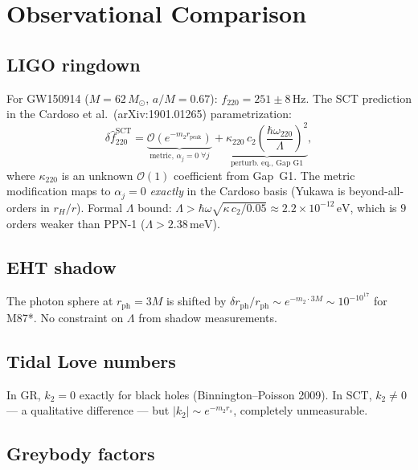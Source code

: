 \documentclass[11pt,a4paper]{article}
\newcommand{\order}[1]{\mathcal{O}(#1)}
\newcommand{\Msun}{M_\odot}
\begin{document}
\section{Observational Comparison}\label{sec:observations}

\subsection{LIGO ringdown}

For GW150914 ($M = 62\,\Msun$, $a/M = 0.67$): $f_{220} = 251 \pm 8\,\mathrm{Hz}$.
The SCT prediction in the Cardoso et al.\ (arXiv:1901.01265) parametrization:
\begin{equation}
\delta\hat{f}_{220}^{\mathrm{SCT}} =
\underbrace{\order{e^{-m_2 r_{\mathrm{peak}}}}}_{\text{metric, } \alpha_j = 0\;\forall j}
+ \underbrace{\kappa_{220}\, c_2 \left(\frac{\hbar\omega_{220}}{\Lambda}\right)^2}_{\text{perturb.\ eq., Gap G1}},
\end{equation}
where $\kappa_{220}$ is an unknown $\order{1}$ coefficient from Gap~G1.
The metric modification maps to $\alpha_j = 0$ \emph{exactly} in the
Cardoso basis (Yukawa is beyond-all-orders in $r_H/r$).
Formal $\Lambda$ bound: $\Lambda > \hbar\omega\sqrt{\kappa\, c_2/0.05}
\approx 2.2 \times 10^{-12}\,\mathrm{eV}$, which is $9$ orders
weaker than PPN-1 ($\Lambda > 2.38\,\mathrm{meV}$).

\subsection{EHT shadow}

The photon sphere at $r_{\mathrm{ph}} = 3M$ is shifted by
$\delta r_{\mathrm{ph}}/r_{\mathrm{ph}} \sim e^{-m_2 \cdot 3M} \sim 10^{-10^{17}}$
for M87*. No constraint on $\Lambda$ from shadow measurements.

\subsection{Tidal Love numbers}

In GR, $k_2 = 0$ exactly for black holes (Binnington--Poisson 2009).
In SCT, $k_2 \neq 0$ --- a qualitative difference --- but
$|k_2| \sim e^{-m_2 r_s}$, completely unmeasurable.

\subsection{Greybody factors}
\end{document}
